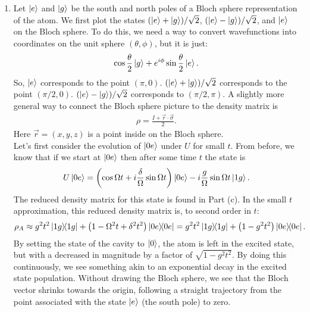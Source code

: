 \documentclass{article}
\theoremstyle{definition}
\newcommand{\f}[2]{\frac{#1}{#2}}
\newcommand{\lp}{\left(}
\newcommand{\rp}{\right)}
\begin{document}
\begin{enumerate}[label=(\alph*)]
\item Let $\ket{e}$ and $\ket{g}$ be the south and north poles of a Bloch sphere representation of the atom.  We first plot the states $( \ket{e} + \ket{g} )/\sqrt{2}$, $(\ket{e} - \ket{g})/\sqrt{2}$, and $\ket{e}$ on the Bloch sphere. To do this, we need a way to convert wavefunctions into coordinates on the unit sphere $(\theta,\phi)$, but it is just:
\begin{align*}
\cos \f{\theta}{2} \ket{g} + e^{i\phi} \sin\f{\theta}{2} \ket{e}. 
\end{align*}
So, $\ket{e}$ corresponds to the point $(\pi, 0)$. $(\ket{e} + \ket{g})/\sqrt{2}$ corresponds to the point $(\pi/2,0)$. $(\ket{e} - \ket{g})/\sqrt{2}$ corresponds to $(\pi/2, \pi)$. A slightly more general way to connect the Bloch sphere picture to the density matrix is 
\begin{align*}
\rho = \f{I + \vec{r}\cdot \vec{\sigma}}{2}. 
\end{align*}
Here $\vec{r} = (x,y,z)$ is a point inside on the Bloch sphere. \\

Let's first consider the evolution of $\ket{0e}$ under $U$ for small $t$. From before, we know that if we start at $\ket{0e}$ then after some time $t$ the state is 
\begin{align*}
U\ket{0e} = \lp \cos \Omega t + i \f{\delta}{\Omega} \sin\Omega t \rp \ket{0e} - i \f{g}{\Omega} \sin \Omega t  \ket{1g}. 
\end{align*}
The reduced density matrix for this state is found in Part (c). In the small $t$ approximation, this reduced density matrix is, to second order in $t$:
\begin{align*}
\rho_A \approx g^2 t^2 \ketbra{1g} + \lp 1 - \Omega^2 t + \delta^2 t^2 \rp \ketbra{0e} = g^2 t^2 \ketbra{1g} + \lp  1 - g^2 t^2 \rp \ketbra{0e}. 
\end{align*}
By setting the state of the cavity to $\ket{0}$, the atom is left in the excited state, but with a decreased in magnitude by a factor of $\sqrt{1 - g^2 t^2}$. By doing this continuously, we see something akin to an exponential decay in the excited state population. Without drawing the Bloch sphere, we see that the Bloch vector shrinks towards the origin, following a straight trajectory from the point associated with the state $\ket{e}$ (the south pole) to zero. \\




\end{enumerate}
\end{document}
